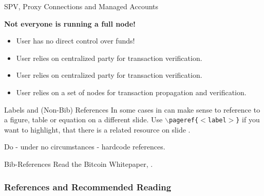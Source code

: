 \documentclass[handout]{beamer}
\begin{document}
\begin{frame}{SPV, Proxy Connections and Managed Accounts}

\color{focus} \textbf{Not everyone is running a full node!} \color{black} \\ \vspace{1em}

	
	\begin{itemize}
		\item<2-> User has no direct control over funds!
		\item<3-> User relies on centralized party for transaction verification.
	\end{itemize}

	\vspace{1em}	
		
		
		\begin{itemize}
		\item<5-> User relies on centralized party for transaction verification.
	\end{itemize}		
	
	\vspace{1em}
	
	
	\begin{itemize}
		\item<7-> User relies on a set of nodes for transaction propagation and verification.

	\end{itemize}
	

	
\end{frame}



\begin{frame}{Labels and (Non-Bib) References}
	In some cases in can make sense to reference to a figure, table or equation on a different slide. Use \texttt{$\backslash$pageref\{$<$label$>$\}} if you want to highlight, that there is a related resource on slide \pageref{fig:logo}.\\ \vspace{1em}
	
	Do - under no circumstances - hardcode references.	
\end{frame}


\begin{frame}{Bib-References}
		Read the Bitcoin Whitepaper, \cite{nakamotoBitcoin2008}.
\end{frame}


\begin{frame}%
\frametitle{References and Recommended Reading}
	
	
\end{frame}
\end{document}
